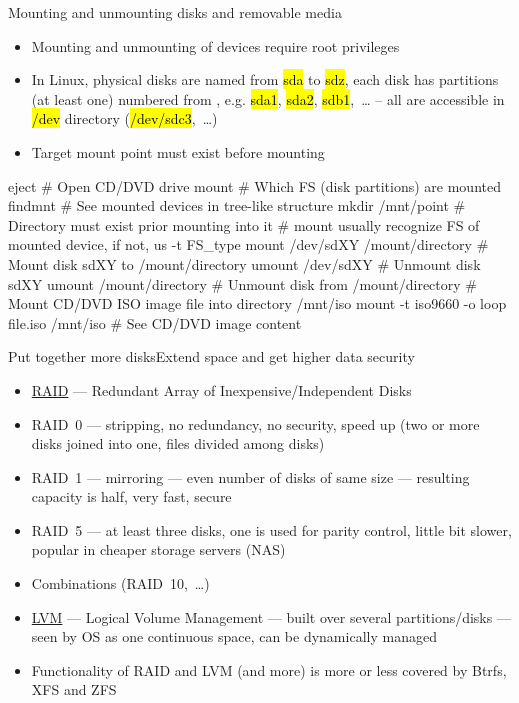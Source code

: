\documentclass[compress, ucs, xelatex, 11pt, xcolor=svgnames,
  hyperref={
    bookmarks=true,
    unicode=true,
    colorlinks=true,
    pdftitle={Linux, command line and MetaCentrum},
    plainpages=false,
    pdfauthor={Vojtech Zeisek},
    pdfsubject={Course about use of Linux command line, writing shell scripts and using MetaCentrum of CESNET},
    pdfcreator={XeLaTeX},
    pdfkeywords={Linux, GNU, BASH, shell, command line, MetaCentrum},
    linkcolor=DarkRed,
    anchorcolor=DarkBlue,
    citecolor=Indigo,
    filecolor=NavyBlue,
    menucolor=DarkMagenta,
    urlcolor=DarkBlue,
    pdftex},
  url={hyphens, lowtilde} %
  ]{beamer}
\renewcommand{\texttt}[1]{\hl{\ttfamily #1}}
\begin{document}
\begin{frame}[fragile]{Mounting and unmounting disks and removable media}
  \begin{itemize}
    \item Mounting and unmounting of devices require root privileges
    \item In Linux, physical disks are named from \texttt{sda} to \texttt{sdz}, each disk has partitions (at least one) numbered from \texttt{1}, e.g. \texttt{sda1}, \texttt{sda2}, \texttt{sdb1},~\ldots{ }-- all are accessible in \texttt{/dev} directory (\texttt{/dev/sdc3},~\ldots)
    \item Target mount point must exist before mounting
  \end{itemize}
  \begin{bashcode}
    eject # Open CD/DVD drive
    mount # Which FS (disk partitions) are mounted
    findmnt # See mounted devices in tree-like structure
    mkdir /mnt/point # Directory must exist prior mounting into it
    # mount usually recognize FS of mounted device, if not, us -t FS_type
    mount /dev/sdXY /mount/directory # Mount disk sdXY to /mount/directory
    umount /dev/sdXY # Unmount disk sdXY
    umount /mount/directory # Unmount disk from /mount/directory
    # Mount CD/DVD ISO image file into directory /mnt/iso
    mount -t iso9660 -o loop file.iso /mnt/iso # See CD/DVD image content
  \end{bashcode}
\end{frame}

\begin{frame}{Put together more disks}{Extend space and get higher data security}
  \label{LVMRAID}
  \begin{itemize}
    \item \href{https://en.wikipedia.org/wiki/RAID}{RAID} --- Redundant Array of Inexpensive/Independent Disks
    \item RAID~0 --- stripping, no redundancy, no security, speed up (two or more disks joined into one, files divided among disks)
    \item RAID~1 --- mirroring --- even number of disks of same size --- resulting capacity is half, very fast, secure
    \item RAID~5 --- at least three disks, one is used for parity control, little bit slower, popular in cheaper storage servers (NAS)
    \item Combinations (RAID~10,~\ldots)
    \item \href{https://en.wikipedia.org/wiki/Logical_volume_management}{LVM} --- Logical Volume Management --- built over several partitions/disks --- seen by OS as one continuous space, can be dynamically managed
    \item Functionality of RAID and LVM (and more) is more or less covered by Btrfs, XFS and ZFS
  \end{itemize}
\end{frame}
\end{document}
